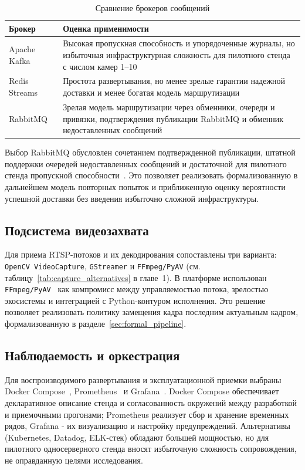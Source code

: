 \begin{table}[H]
\caption{Сравнение брокеров сообщений}
\label{tab:broker_choice}
\begin{tabularx}{\textwidth}{>{\raggedright\arraybackslash}p{}X}
\toprule
Брокер & Оценка применимости \\
\midrule
Apache Kafka & Высокая пропускная способность и упорядоченные журналы, но избыточная инфраструктурная сложность для пилотного стенда с числом камер 1--10 \\
Redis Streams & Простота развертывания, но менее зрелые гарантии надежной доставки и менее богатая модель маршрутизации \\
RabbitMQ~\cite{rabbitmq_docs,rabbitmq_confirms,rabbitmq_dlq} & Зрелая модель маршрутизации через обменники, очереди и привязки, подтверждения публикации RabbitMQ и обменник недоставленных сообщений \\
\bottomrule
\end{tabularx}
\end{table}

Выбор RabbitMQ обусловлен сочетанием подтвержденной публикации, штатной поддержки очередей недоставленных сообщений и достаточной для пилотного стенда пропускной способности~\cite{rabbitmq_docs,rabbitmq_confirms,rabbitmq_dlq}. Это позволяет реализовать формализованную в дальнейшем модель повторных попыток и приближенную оценку вероятности успешной доставки без введения избыточно сложной инфраструктуры.

\subsection{Подсистема видеозахвата}

Для приема RTSP-потоков и их декодирования сопоставлены три варианта: \texttt{OpenCV VideoCapture}, \texttt{GStreamer} и \texttt{FFmpeg/PyAV} (см. таблицу~\ref{tab:capture_alternatives} в главе~1). В платформе использован \texttt{FFmpeg/PyAV}~\cite{ffmpeg_docs,pyav_docs} как компромисс между управляемостью потока, зрелостью экосистемы и интеграцией с Python-контуром исполнения. Это решение позволяет реализовать политику замещения кадра последним актуальным кадром, формализованную в разделе~\ref{sec:formal_pipeline}.

\subsection{Наблюдаемость и оркестрация}

Для воспроизводимого развертывания и эксплуатационной приемки выбраны Docker Compose~\cite{docker_docs}, Prometheus~\cite{prometheus_docs} и Grafana~\cite{grafana_docs}. Docker Compose обеспечивает декларативное описание стенда и согласованность окружений между разработкой и приемочными прогонами; Prometheus реализует сбор и хранение временных рядов, Grafana - их визуализацию и настройку предупреждений. Альтернативы (Kubernetes, Datadog, ELK-стек) обладают большей мощностью, но для пилотного односерверного стенда вносят избыточную сложность сопровождения, не оправданную целями исследования.

